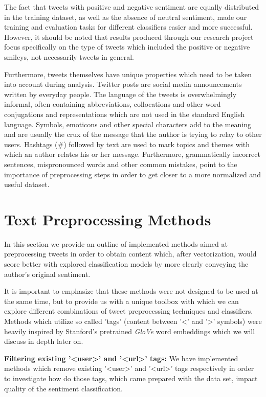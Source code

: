 \documentclass[10pt,conference]{IEEEtran}
\begin{document}
The fact that tweets with positive and negative sentiment are equally distributed in the training dataset, as well as the absence of neutral sentiment, made our training and evaluation tasks for different classifiers easier and more successful. However, it should be noted that results produced through our research project focus specifically on the type of tweets which included the positive or negative smileys, not necessarily tweets in general.
 
Furthermore, tweets themselves have unique properties which need to be taken into account during analysis. Twitter posts are social media announcements written by everyday people. The language of the tweets is overwhelmingly informal, often containing abbreviations, collocations and other word conjugations and representations which are not used in the standard English language. Symbols, emoticons and other special characters add to the meaning and are usually the crux of the message that the author is trying to relay to other users. Hashtags (\#) followed by text are used to mark topics and themes with which an author relates his or her message. Furthermore, grammatically incorrect sentences, mispronounced words and other common mistakes, point to the importance of preprocessing steps in order to get closer to a more normalized and useful dataset.

\section{Text Preprocessing Methods}
\label{sec:preprocessing}

In this section we provide an outline of implemented methods aimed at preprocessing tweets in order to obtain content which, after vectorization, would score better with explored classification models by more clearly conveying the author's original sentiment.

It is important to emphasize that these methods were not designed to be used at the same time, but to provide us with a unique toolbox with which we can explore different combinations of tweet preprocessing techniques and classifiers. Methods which utilize so called 'tags' (content between '<' and '>' symbols) were heavily inspired by Stanford's pretrained \textit{GloVe} word embeddings which we will discuss in depth later on.
 
\textbf{Filtering existing '<user>' and '<url>' tags:} We have implemented methods which remove existing '<user>' and '<url>' tags respectively in order to investigate how do those tags, which came prepared with the data set, impact quality of the sentiment classification.
\end{document}
